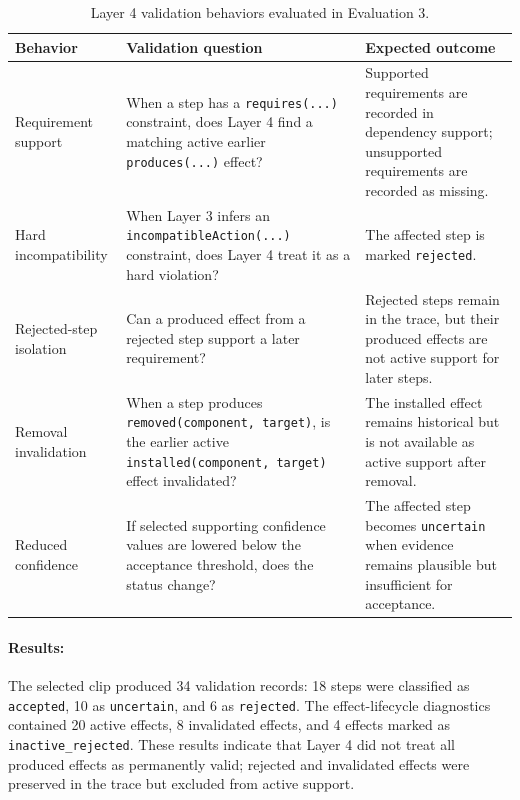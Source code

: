 \begin{table}[htbp]
\centering
\caption{Layer 4 validation behaviors evaluated in Evaluation 3.}
\label{tab:evaluation-validation-scenarios}
\begin{tabular}{p{} p{} p{}}
\toprule
Behavior & Validation question & Expected outcome \\
\midrule
Requirement support &
When a step has a \texttt{requires(...)} constraint, does Layer 4 find a matching active earlier \texttt{produces(...)} effect? &
Supported requirements are recorded in dependency support; unsupported requirements are recorded as missing. \\

Hard incompatibility &
When Layer 3 infers an \texttt{incompatibleAction(...)} constraint, does Layer 4 treat it as a hard violation? &
The affected step is marked \texttt{rejected}. \\

Rejected-step isolation &
Can a produced effect from a rejected step support a later requirement? &
Rejected steps remain in the trace, but their produced effects are not active support for later steps. \\

Removal invalidation &
When a step produces \texttt{removed(component, target)}, is the earlier active \texttt{installed(component, target)} effect invalidated? &
The installed effect remains historical but is not available as active support after removal. \\

Reduced confidence &
If selected supporting confidence values are lowered below the acceptance threshold, does the status change? &
The affected step becomes \texttt{uncertain} when evidence remains plausible but insufficient for acceptance. \\
\bottomrule
\end{tabular}
\end{table}


\paragraph{Results:}
The selected clip produced 34 validation records: 18 steps were classified as
\texttt{accepted}, 10 as \texttt{uncertain}, and 6 as \texttt{rejected}. The
effect-lifecycle diagnostics contained 20 active effects, 8 invalidated effects,
and 4 effects marked as \texttt{inactive\_rejected}. These results indicate that
Layer 4 did not treat all produced effects as permanently valid; rejected and
invalidated effects were preserved in the trace but excluded from active support.

